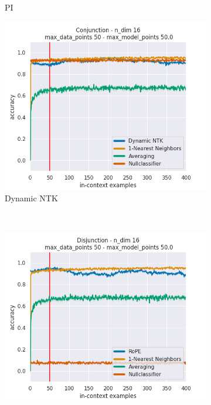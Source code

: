 \documentclass[letterpaper]{article} %
\begin{document}
\begin{figure}[tp]
\begin{subfigure}[t]{0.32\linewidth}
        \caption{PI}
    \end{subfigure}
    \begin{subfigure}[t]{0.32\linewidth}
        \includegraphics[width=\linewidth]{AnonymousSubmission/LaTeX/imgs/appendix/conjunction/ntk.png}
        \caption{Dynamic NTK}
    \end{subfigure}
    \\
    \begin{subfigure}[t]{0.32\linewidth}
        \includegraphics[width=\linewidth]{AnonymousSubmission/LaTeX/imgs/appendix/disjunction/rope.png}

\end{subfigure}
\end{figure}
\end{document}
